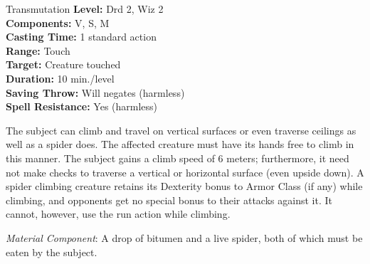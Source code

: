 {Transmutation}
{
	\textbf{Level:}
	Drd 2, Wiz 2\\
	\textbf{Components:}
	V, S, M\\
	\textbf{Casting Time:}
	1 standard action\\
	\textbf{Range:}
	Touch\\
	\textbf{Target:}
	Creature touched\\
	\textbf{Duration:}
	10 min./level\\
	\textbf{Saving Throw:}
	Will negates (harmless)\\
	\textbf{Spell Resistance:}
	Yes (harmless)\\
}
{
	The subject can climb and travel on vertical surfaces or even traverse ceilings as well as a spider does. The affected creature must have its hands free to climb in this manner. The subject gains a climb speed of 6 meters; furthermore, it need not make  checks to traverse a vertical or horizontal surface (even upside down). A spider climbing creature retains its Dexterity bonus to Armor Class (if any) while climbing, and opponents get no special bonus to their attacks against it. It cannot, however, use the run action while climbing.

	\textit{Material Component}:
	A drop of bitumen and a live spider, both of which must be eaten by the subject.

}
